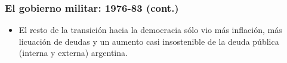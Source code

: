 \documentclass[14pt,aspectratio=169]{beamer}
\begin{document}
                \begin{frame}\frametitle{El gobierno militar: 1976-83 (cont.)}
                 \begin{itemize}\itemsep 5pt \medskip
                 \item El resto de la transición hacia la democracia
                   sólo vio más inflación, más licuación de deudas y
                   un aumento casi insostenible de la deuda pública
                   (interna y externa) argentina. 
                   \end{itemize} 
               \end{frame}

  

  
               
\end{document}
